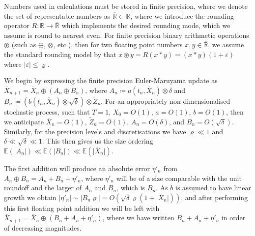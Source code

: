 \documentclass[manuscript,review]{acmart}
\begin{document}
Numbers used in calculations must be stored in finite precision, where we denote the set of representable numbers as $ \overline{\mathbb{R}} \subset \mathbb{R}$, where we introduce the rounding operator $ R \colon \mathbb{R} \to \overline{\mathbb{R}}$ which implements the desired rounding mode, which we assume is round to nearest even. For finite precision binary arithmetic operations $ \circledast $ (such as $\oplus$, $\otimes$, etc.), then for two floating point numbers $ x,y \in \overline{\mathbb{R}} $, we assume the standard rounding model by \citet[2.2, (2.4)]{higham2002accuracy} \citep[page~99, (13.7)]{trefethen1997numerical} that $ x \circledast y = R(x\ast y) = (x \ast y ) (1 + \varepsilon)$ where $ \lvert \varepsilon\rvert \leq \varrho $. 

We begin by expressing the finite precision Euler-Maruyama update as  
$ \overline{X}_{n+1} = \overline{X}_n \oplus (A_n \oplus B_n ) $, where $ A_n \coloneqq 
a(t_n, \overline{X}_n) \otimes \delta $ and $ B_n \coloneqq  (b(t_n, \overline{X}_n) \otimes \sqrt{\delta}) \otimes \widetilde{Z}_n $. For an appropriately non dimensionalised stochastic process, such that $ T = 1 $, $ X_0 = O(1) $, $ a = O(1) $, $ b = O(1) $, then we anticipate $ \overline{X}_n = O(1) $, $ \widetilde{Z}_n = O(1) $, $ A_n = O(\delta) $, and $ B_n = O(\sqrt{\delta}) $. Similarly, for the precision levels and discretisations we have $ \varrho \ll 1 $ and $ \delta \ll \sqrt{\delta} \ll 1 $. This then gives us the size ordering $ \mathbb{E}(\lvert A_n \rvert) \ll \mathbb{E}(\lvert B_n \rvert) \ll \mathbb{E}(\lvert \overline{X}_n \rvert)$.

The first addition will produce an absolute error $ \eta'_n $ from $ A_n \oplus B_n = A_n + B_n + \eta'_n  $, where $ \eta'_n $ will be of  a size comparable with the unit roundoff and the larger of $ A_n $ and $ B_n $, which is $ B_n $. As $ b $ is assumed to have linear growth we obtain $ \lvert \eta'_n\rvert  \sim \lvert B_n \varrho\rvert  = O(\sqrt{\delta} \varrho (1 + \lvert\overline{X}_n\rvert))$, and after performing this first floating point addition we will be left with
$ \overline{X}_{n+1} = \overline{X}_n \oplus (B_n + A_n + \eta'_n ) $,
where we have written $ B_n + A_n + \eta'_n $ in order of decreasing magnitudes. 
\end{document}
